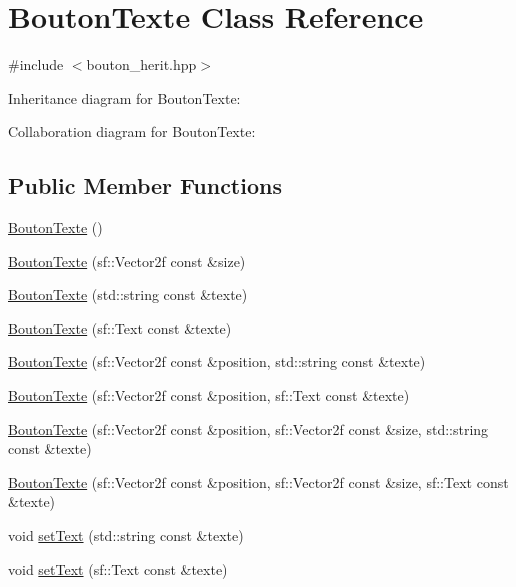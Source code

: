 \hypertarget{classBoutonTexte}{}\section{Bouton\+Texte Class Reference}
\label{classBoutonTexte}


{\ttfamily \#include $<$bouton\+\_\+herit.\+hpp$>$}



Inheritance diagram for Bouton\+Texte\+:


Collaboration diagram for Bouton\+Texte\+:
\subsection*{Public Member Functions}
\begin{DoxyCompactItemize}
\item 
\hyperlink{classBoutonTexte_a2a7d9babee8e65e776e83e5765e1ce60}{Bouton\+Texte} ()
\item 
\hyperlink{classBoutonTexte_a1051f539ed840e2552725892d9a57194}{Bouton\+Texte} (sf\+::\+Vector2f const \&size)
\item 
\hyperlink{classBoutonTexte_ad48d557bfa607a183f57485f32795264}{Bouton\+Texte} (std\+::string const \&texte)
\item 
\hyperlink{classBoutonTexte_ae0a1e9127faeb62d40138da1c2930702}{Bouton\+Texte} (sf\+::\+Text const \&texte)
\item 
\hyperlink{classBoutonTexte_a181207cd9efb02368cafec0a07eba955}{Bouton\+Texte} (sf\+::\+Vector2f const \&position, std\+::string const \&texte)
\item 
\hyperlink{classBoutonTexte_ae1346a4ba4971549fee0e73a9d1b23cd}{Bouton\+Texte} (sf\+::\+Vector2f const \&position, sf\+::\+Text const \&texte)
\item 
\hyperlink{classBoutonTexte_a836b0b82db082f55517c39860d378c97}{Bouton\+Texte} (sf\+::\+Vector2f const \&position, sf\+::\+Vector2f const \&size, std\+::string const \&texte)
\item 
\hyperlink{classBoutonTexte_a73b3eb4345579f281181d3f5df4f196f}{Bouton\+Texte} (sf\+::\+Vector2f const \&position, sf\+::\+Vector2f const \&size, sf\+::\+Text const \&texte)
\item 
void \hyperlink{classBoutonTexte_a56d8e807f6bfa767c7e99e86111cb3c5}{set\+Text} (std\+::string const \&texte)
\item 
void \hyperlink{classBoutonTexte_ad0f834397021489f298a7e4f50c2e575}{set\+Text} (sf\+::\+Text const \&texte)

\end{DoxyCompactItemize}
